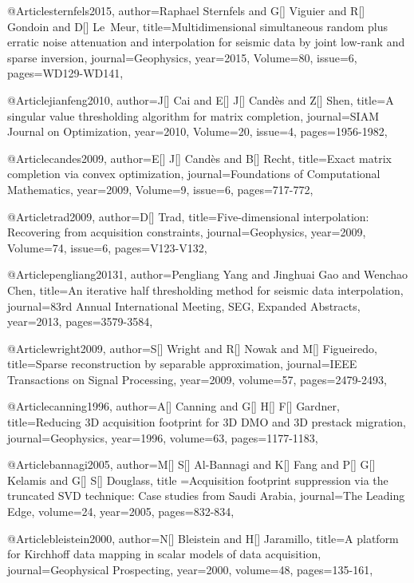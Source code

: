 {@Article{sternfels2015,
  author={Raphael Sternfels and G[] Viguier and R[] Gondoin and D[] Le~Meur},
  title={Multidimensional simultaneous random plus erratic noise attenuation and interpolation for seismic data by joint low-rank and sparse inversion},
  journal={Geophysics},
  year=2015,
  Volume=80,
  issue=6,
  pages={WD129-WD141},
}

@Article{jianfeng2010,
  author={J[] Cai and E[] J[] Cand\`{e}s and Z[] Shen},
  title={A singular value thresholding algorithm for matrix completion},
  journal={SIAM Journal on Optimization},
  year=2010,
  Volume=20,
  issue=4,
  pages={1956-1982},
}

@Article{candes2009,
  author={E[] J[] Cand\`{e}s and B[] Recht},
  title={Exact matrix completion via convex optimization},
  journal={Foundations of Computational Mathematics},
  year=2009,
  Volume=9,
  issue=6,
  pages={717-772},
}

@Article{trad2009,
  author={D[] Trad},
  title={Five-dimensional interpolation: Recovering from acquisition constraints},
  journal={Geophysics},
  year=2009,
  Volume=74,
  issue=6,
  pages={V123-V132},
}

@Article{pengliang20131,
  author={Pengliang Yang and Jinghuai Gao and Wenchao Chen},
  title={An iterative half thresholding method for seismic data interpolation},
  journal={83rd Annual International Meeting, SEG, Expanded Abstracts},
  year=2013,
  pages={3579-3584},
}

@Article{wright2009,
  author={S[] Wright and R[] Nowak and M[] Figueiredo},
  title={Sparse reconstruction by separable approximation},
  journal={IEEE Transactions on Signal Processing},
  year=2009,
  volume=57,
  pages={2479-2493},
}

@Article{canning1996,
  author={A[] Canning and G[] H[] F[] Gardner},
  title={Reducing 3{D} acquisition footprint for 3{D} DMO and 3{D} prestack migration},
  journal={Geophysics},
  year=1996,
  volume=63,
  pages={1177-1183},
}

@Article{bannagi2005,
  author={M[] S[] Al-Bannagi and K[] Fang and P[] G[] Kelamis and G[] S[] Douglass},
  title ={Acquisition footprint suppression via the truncated SVD technique: Case studies from Saudi Arabia},
  journal={The Leading Edge},
  volume=24,
  year=2005,
  pages={832-834},
}

@Article{bleistein2000,
  author={N[] Bleistein and H[] Jaramillo},
  title={A platform for Kirchhoff data mapping in scalar models of data acquisition},
  journal={Geophysical Prospecting},
  year=2000,
  volume=48,
  pages={135-161},
}

}
